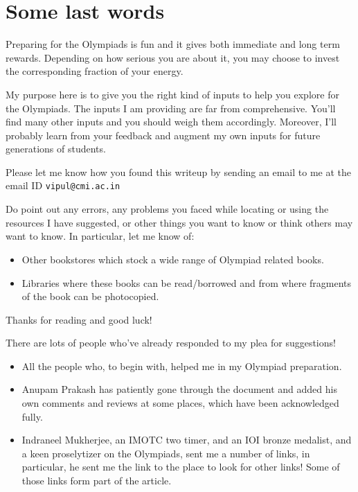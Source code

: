 \documentclass[a4paper]{amsart}
\begin{document}
\section{Some last words}

Preparing for the Olympiads is fun and it gives both immediate and long term rewards. Depending on how serious you are about it,
you may choose to invest the corresponding fraction of your energy.

My purpose here is to give you the right kind of inputs to help you explore for the Olympiads. The inputs I am providing are far from
comprehensive. You'll find many other inputs and you should weigh them accordingly. Moreover, I'll probably learn from your feedback
and augment my own inputs for future generations of students.

Please let me know how you found this writeup by sending an email to me at the email ID {\tt vipul@cmi.ac.in}

Do point out any errors, any problems you faced while locating or using the resources I have suggested, or other things you want
to know or think others may want to know. In particular, let me know of:

\begin{itemize}

\item Other bookstores which stock a wide range of Olympiad
  related books.

\item Libraries where these books can be read/borrowed and from where
  fragments of the book can be photocopied.

\end{itemize}

Thanks for reading and good luck!

\appendix

There are lots of people who've already responded to my plea for suggestions!

\begin{itemize}

\item All the people who, to begin with, helped me in my Olympiad preparation.

\item Anupam Prakash has patiently gone through the document and added his own comments and reviews at some places, which have been
  acknowledged fully.

\item Indraneel Mukherjee, an IMOTC two timer, and an
  IOI bronze medalist, and a keen proselytizer on the Olympiads, sent me a number
  of links, in particular, he sent me the link to the place to look for other links! Some of those links form part of the article.

\end{itemize}
\appendix
\end{document}
